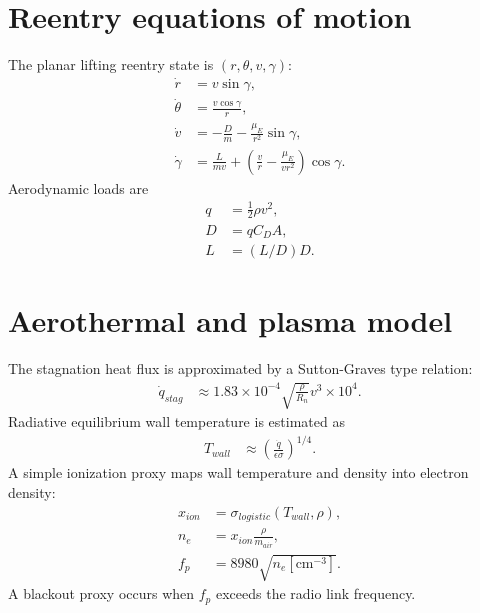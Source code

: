 \documentclass[11pt,a4paper]{article}
\begin{document}
\section{Reentry equations of motion}
The planar lifting reentry state is $(r,\theta,v,\gamma)$:
\begin{align}
\dot r &= v\sin\gamma,\\
\dot\theta &= \frac{v\cos\gamma}{r},\\
\dot v &= -\frac{D}{m}-\frac{\mu_E}{r^2}\sin\gamma,\\
\dot\gamma &= \frac{L}{mv}+\left(\frac{v}{r}-\frac{\mu_E}{vr^2}\right)\cos\gamma.
\end{align}
Aerodynamic loads are
\begin{align}
q&=\frac12\rho v^2,\\
D&=qC_DA,\\
L&=(L/D)D.
\end{align}

\section{Aerothermal and plasma model}
The stagnation heat flux is approximated by a Sutton-Graves type relation:
\begin{align}
\dot q_{stag} &\approx 1.83\times10^{-4}\sqrt{\frac{\rho}{R_n}}v^3\times10^4.
\end{align}
Radiative equilibrium wall temperature is estimated as
\begin{align}
T_{wall}&\approx\left(\frac{\dot q}{\epsilon\sigma}\right)^{1/4}.
\end{align}
A simple ionization proxy maps wall temperature and density into electron density:
\begin{align}
x_{ion}&=\sigma_{logistic}(T_{wall},\rho),\\
n_e&=x_{ion}\frac{\rho}{m_{air}},\\
f_p&=8980\sqrt{n_e[\mathrm{cm}^{-3}]}. 
\end{align}
A blackout proxy occurs when $f_p$ exceeds the radio link frequency.
\end{document}
